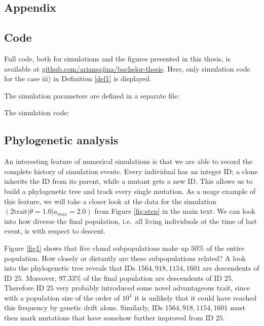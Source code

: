 \documentclass[11pt, a4paper]{article}
\newcommand{\giturl}{\url{github.com/ariansajina/bachelor-thesis}}
\theoremstyle{definition}
\begin{document}
\newpage
\begin{appendices}
\section{Appendix}

    \subsection{Code}
    Full code, both for simulations and the figures presented in this thesis, is available at \giturl. Here, only simulation code for the case iii) in Definition \ref{def1} is displayed.

    The simulation parameters are defined in a separate file:
    \scriptsize  \normalsize

    The simulation code:
    \scriptsize  \normalsize

    \subsection{Phylogenetic analysis}
    An interesting feature of numerical simulations is that we are able to record the complete history of simulation events.
    Every individual has an integer ID; a clone inherits the ID from its parent, while a mutant gets a new ID. This allows us to build a phylogenetic tree and track every single mutation. As a usage example of this feature, we will take a closer look at the data for the simulation $(\text{2trait} | \theta = 1.0 | a_{max} = 2.0)$ from Figure \ref{fig:step} in the main text. We can look into how diverse the final population, i.e.\ all living individuals at the time of last event, is with respect to descent.

    Figure \ref{fig1} shows that five clonal subpopulations make up $50\%$ of the entire population. How closely or distantly are these subpopulations related? A look into the phylogenetic tree reveals that IDs $1564, 918, 1154, 1601$ are descendents of ID $25$. Moreover, $97.33\%$ of the final population are descendents of ID $25$. Therefore ID $25$ very probably introduced some novel advantageous trait, since with a population size of the order of $10^4$ it is unlikely that it could
    have reached this frequency by genetic drift alone. Similarly, IDs $1564, 918, 1154, 1601$ must then mark mutations that have somehow further improved from ID $25$.


\end{appendices}
\end{document}
